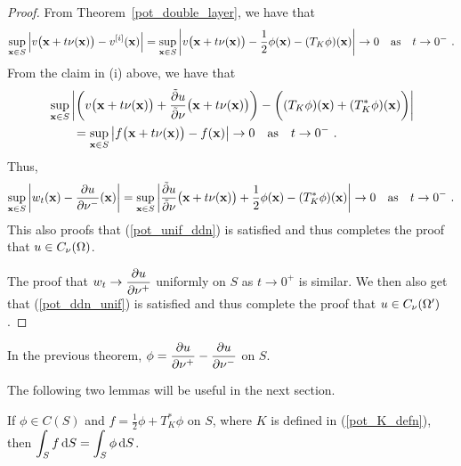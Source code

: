 \begin{proof}
From Theorem~\ref{pot_double_layer}, we have that
\[
\sup_{\mathbf{x}\in S}
\left|v\big(\mathbf{x}+t\mathbf{\nu}(\mathbf{x})\big) - v^{[i]}(\mathbf{x})\right|
= \sup_{\mathbf{x}\in S}
\left|v\big(\mathbf{x}+t\mathbf{\nu}(\mathbf{x})\big) -
\frac{1}{2} \phi(\mathbf{x}) - (T_K \phi)(\mathbf{x}) \right|
\rightarrow 0 \quad \text{as} \quad t\rightarrow 0^-\ .
\]
From the claim in (i) above, we have that
\begin{align*}
&\sup_{\mathbf{x}\in S}
\left| \left(v\big(\mathbf{x}+t\mathbf{\nu}(\mathbf{x})\big)
+ \frac{\tilde{\partial}{u}}{\tilde{\partial}{\mathbf{\nu}}}\big(\mathbf{x}+t\mathbf{\nu}(\mathbf{x})\big)\right) -
\bigg( (T_K \phi)(\mathbf{x}) + (T_K^\ast \phi)(\mathbf{x})\bigg) \right| \\
&\qquad = \sup_{\mathbf{x}\in S}
\left| f\big(\mathbf{x}+t\mathbf{\nu}(\mathbf{x})\big) - f(\mathbf{x}) \right|
\rightarrow 0 \quad \text{as} \quad t \rightarrow 0^- \ .
\end{align*}
Thus,
\[
\sup_{\mathbf{x}\in S} \left| w_t(\mathbf{x})
- \frac{\partial{u}}{\partial \mathbf{\nu}^-}(\mathbf{x}) \right|
= \sup_{\mathbf{x}\in S} \left| 
\frac{\tilde{\partial}{u}}{\tilde{\partial}{\mathbf{\nu}}}\big(\mathbf{x}+t\mathbf{\nu}(\mathbf{x})\big)
+ \frac{1}{2} \phi(\mathbf{x}) - (T_K^\ast \phi)(\mathbf{x}) \right|
\to 0 \quad \text{as} \quad
t\rightarrow 0^- \ .
\]
This also proofs
that (\ref{pot_unif_ddn}) is satisfied and thus completes the proof that
$u \in C_{\mathbf{\nu}}(\Omega)$.

The proof that $\displaystyle w_t \rightarrow \frac{\partial{u}}{\partial \mathbf{\nu}^+}$
uniformly on $S$ as $t\rightarrow 0^+$ is similar.  We then also get
that (\ref{pot_ddn_unif}) is satisfied and thus complete the proof
that $u \in C_{\mathbf{\nu}}(\Omega^{\prime})$.
\end{proof}

\begin{cor} \label{pot_cor_pdpdm}
In the previous theorem,
$\displaystyle \phi = \frac{\partial{u}}{\partial \mathbf{\nu}^+}- \frac{\partial{u}}{\partial \mathbf{\nu}^-}$ on $S$.
\end{cor}

The following two lemmas will be useful in the next section.

\begin{lemma} \label{pot_sol_zeroB}
If $\phi \in C(S)$ and $\displaystyle f = \frac{1}{2} \phi + T^\ast_K \phi$ on
$S$, where $K$ is defined in (\ref{pot_K_defn}), then
$\displaystyle \int_{S} f \,\mathrm{d}{S} = \int_{S} \phi \,\mathrm{d}{S}$.
\end{lemma}

